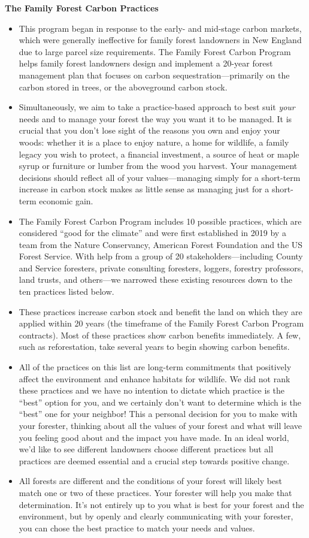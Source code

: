 \documentclass{article}\usepackage[]{graphicx}\usepackage[]{color}
\begin{document}
{\Large{\textbf{The Family Forest Carbon Practices}}}
  \begin{itemize}
  \item This program began in response to the early- and mid-stage carbon markets, which were generally ineffective for family forest landowners in New England due to large parcel size requirements. The Family Forest Carbon Program helps family forest landowners design and implement a 20-year forest management plan that focuses on carbon sequestration---primarily on the carbon stored in trees, or the aboveground carbon stock. 
  \item Simultaneously, we aim to take a practice-based approach to best suit \textit{your} needs and to manage your forest the way you want it to be managed. It is crucial that you don't lose sight of the reasons you own and enjoy your woods: whether it is a place to enjoy nature, a home for wildlife, a family legacy you wish to protect, a financial investment, a source of heat or maple syrup or furniture or lumber from the wood you harvest. Your management decisions should reflect all of your values---managing simply for a short-term increase in carbon stock makes as little sense as managing just for a short-term economic gain.
  \item The Family Forest Carbon Program includes 10 possible practices, which are considered ``good for the climate'' and were first established in 2019 by a team from the Nature Conservancy, American Forest Foundation and the US Forest Service. With help from a group of 20 stakeholders---including County and Service foresters, private consulting foresters, loggers, forestry professors, land trusts, and others---we narrowed these existing resources down to the ten practices listed below. 
  \item These practices increase carbon stock and benefit the land on which they are applied within 20 years (the timeframe of the Family Forest Carbon Program contracts). Most of these practices show carbon benefits immediately. A few, such as reforestation, take several years to begin showing carbon benefits.
  \item All of the practices on this list are long-term commitments that positively affect the environment and enhance habitats for wildlife. We did not rank these practices and we have no intention to dictate which practice is the ``best'' option for you, and we certainly don't want to determine which is the ``best'' one for your neighbor! This a personal decision for you to make with your forester, thinking about all the values of your forest and what will leave you feeling good about and the impact you have made. In an ideal world, we'd like to see different landowners choose different practices but all practices are deemed essential and a crucial step towards positive change.
  \item All forests are different and the conditions of your forest will likely best match one or two of these practices. Your forester will help you make that determination. It's not entirely up to you what is best for your forest and the environment, but by openly and clearly communicating with your forester, you can chose the best practice to match your needs and values. 
  

\end{itemize}
\end{document}
